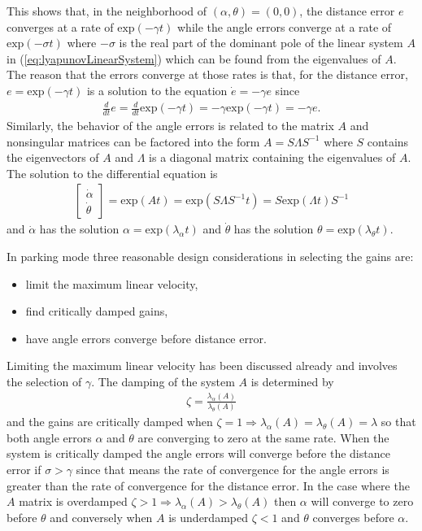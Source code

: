 This shows that, in the neighborhood of $(\alpha, \theta)=(0, 0)$, the distance error $e$ converges at a rate of $\text{exp}(-\gamma t)$ while the angle errors converge at a rate of $\text{exp}(-\sigma t)$ where $-\sigma$ is the real part of the dominant pole of the linear system $A$ in (\ref{eq:lyapunovLinearSystem}) which can be found from the eigenvalues of $A$. The reason that the errors converge at those rates is that, for the distance error, $e=\text{exp}(-\gamma t)$ is a solution to the equation $\dot{e}=-\gamma e$ since 
\begin{align*}
\tfrac{d}{dt}e=\tfrac{d}{dt}\text{exp}(-\gamma t) = -\gamma \text{exp}(-\gamma t)=-\gamma e.
\end{align*}
Similarly, the behavior of the angle errors is related to the matrix $A$ and nonsingular matrices can be factored into the form $A=S\Lambda S^{-1}$ where $S$ contains the eigenvectors of $A$ and $\Lambda$ is a diagonal matrix containing the eigenvalues of $A$. The solution to the differential equation is
\begin{align*}
\left[\begin{array}{c} \dot{\alpha} \\ \dot{\theta} \end{array}\right] = \text{exp}(At)=\text{exp}(S\Lambda S^{-1}t)=S\text{exp}(\Lambda t)S^{-1}
\end{align*}
and $\dot{\alpha}$ has the solution $\alpha=\text{exp}(\lambda_\alpha t)$ and $\dot{\theta}$ has the solution $\theta=\text{exp}(\lambda_\theta t)$.

In parking mode three reasonable design considerations in selecting the gains are:
\begin{itemize}
\item limit the maximum linear velocity,
\item find critically damped gains,
\item have angle errors converge before distance error.
\end{itemize}
Limiting the maximum linear velocity has been discussed already and involves the selection of $\gamma$. The damping of the system $A$ is determined by
\begin{align*}
\zeta = \frac{\lambda_\alpha(A)}{\lambda_\theta(A)}
\end{align*}
and the gains are critically damped when $\zeta = 1 \Rightarrow \lambda_\alpha(A)=\lambda_\theta(A)=\lambda$ so that both angle errors $\alpha$ and $\theta$ are converging to zero at the same rate. When the system is critically damped the angle errors will converge before the distance error if $\sigma>\gamma$ since that means the rate of convergence for the angle errors is greater than the rate of convergence for the distance error. In the case where the $A$ matrix is overdamped $\zeta > 1 \Rightarrow \lambda_\alpha(A) > \lambda_\theta(A)$ then $\alpha$ will converge to zero before $\theta$ and conversely when $A$ is underdamped $\zeta < 1$ and $\theta$ converges before $\alpha$.

